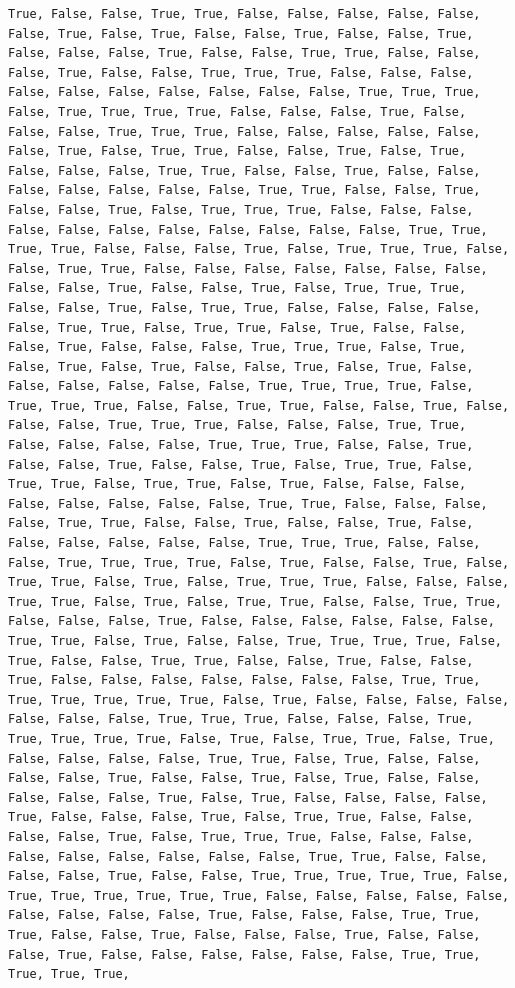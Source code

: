 \documentclass[
  letterpaper,
  DIV=11,
  numbers=noendperiod]{scrartcl}
\begin{document}
\begin{verbatim}
True, False, False, True, True, False, False, False, False, False, False, True, False, True, False, False, True, False, False, True, False, False, False, True, False, False, True, True, False, False, False, True, False, False, True, True, True, False, False, False, False, False, False, False, False, False, False, True, True, True, False, True, True, True, True, False, False, False, True, False, False, False, True, True, True, False, False, False, False, False, False, True, False, True, True, False, False, True, False, True, False, False, False, True, True, False, False, True, False, False, False, False, False, False, False, True, True, False, False, True, False, False, True, False, True, True, True, False, False, False, False, False, False, False, False, False, False, False, True, True, True, True, False, False, False, True, False, True, True, True, False, False, True, True, False, False, False, False, False, False, False, False, False, True, False, False, True, False, True, True, True, False, False, True, False, True, True, False, False, False, False, False, True, True, False, True, True, False, True, False, False, False, True, False, False, False, True, True, True, False, True, False, True, False, True, False, False, True, False, True, False, False, False, False, False, False, True, True, True, True, False, True, True, True, False, False, True, True, False, False, True, False, False, False, True, True, True, False, False, False, True, True, False, False, False, False, True, True, True, False, False, True, False, False, True, False, False, True, False, True, True, False, True, True, False, True, True, False, True, False, False, False, False, False, False, False, False, True, True, False, False, False, False, True, True, False, False, True, False, False, True, False, False, False, False, False, False, True, True, True, False, False, False, True, True, True, True, False, True, False, False, True, False, True, True, False, True, False, True, True, True, False, False, False, True, True, False, True, False, True, True, False, False, True, True, False, False, False, True, False, False, False, False, False, False, True, True, False, True, False, False, True, True, True, True, False, True, False, False, True, True, False, False, True, False, False, True, False, False, False, False, False, False, False, True, True, True, True, True, True, True, False, True, False, False, False, False, False, False, False, True, True, True, False, False, False, True, True, True, True, True, False, True, False, True, True, False, True, False, False, False, False, True, True, False, True, False, False, False, False, True, False, False, True, False, True, False, False, False, False, False, True, False, True, False, False, False, False, True, False, False, False, True, False, True, True, False, False, False, False, True, False, True, True, True, False, False, False, False, False, False, False, False, False, True, True, False, False, False, False, True, False, False, True, True, True, True, True, False, True, True, True, True, True, True, False, False, False, False, False, False, False, False, False, True, False, False, False, True, True, True, False, False, True, False, False, False, True, False, False, False, True, False, False, False, False, False, False, True, True, True, True, True, 
\end{verbatim}
\end{document}
